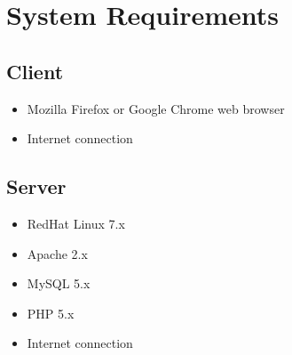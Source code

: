 \documentclass[11pt]{amsart}
\begin{document}
\section{System Requirements}
\subsection{Client}
\begin{itemize}
    \item{Mozilla Firefox or Google Chrome web browser}
    \item{Internet connection}
\end{itemize}

\subsection{Server}
\begin{itemize}
    \item{RedHat Linux 7.x}
    \item{Apache 2.x}
    \item{MySQL 5.x}
    \item{PHP 5.x}
    \item{Internet connection}
\end{itemize}
\end{document}

